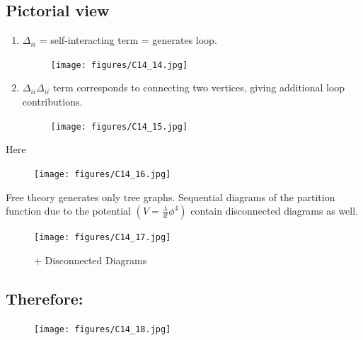 \documentclass[14pt]{article} %
\begin{document}
\subsection*{Pictorial view}
\begin{enumerate}
\item $\Delta_{ii}$ = self-interacting term = generates loop.
\begin{figure}[H]
    \centering
    \texttt{[image: figures/C14\_14.jpg]}
    \caption*{}
    \label{fig:placeholder}
\end{figure}
\vspace{-1.5cm}
\item $\Delta_{ii} \Delta_{ii}$ term corresponds to connecting two vertices, giving additional loop contributions.
\begin{figure}[H]
    \centering
    \texttt{[image: figures/C14\_15.jpg]}
    \caption*{}
    \label{fig:placeholder}
\end{figure}
\vspace{-1.5cm}
\end{enumerate}
Here
\vspace{-1cm}
\begin{figure}[H]
    \centering
    \texttt{[image: figures/C14\_16.jpg]}
    \caption*{}
    \label{fig:placeholder}
\end{figure}
\vspace{-1.5cm}

\begin{tcolorbox}
Free theory generates only tree graphs. Sequential diagrams of the partition function due to the potential $\left( V = \frac{\lambda}{4!} \phi^4 \right)$ contain disconnected diagrams as well.
\end{tcolorbox}
\begin{figure}[H]
    \centering
    \texttt{[image: figures/C14\_17.jpg]}
    \caption*{$+$ Disconnected Diagrams}
    \label{fig:placeholder}
\end{figure}
\subsection*{Therefore:}
\begin{figure}[H]
    \centering
    \texttt{[image: figures/C14\_18.jpg]}
    \caption*{}
    \label{fig:placeholder}
\end{figure}
\vspace{1cm}
\end{document}
